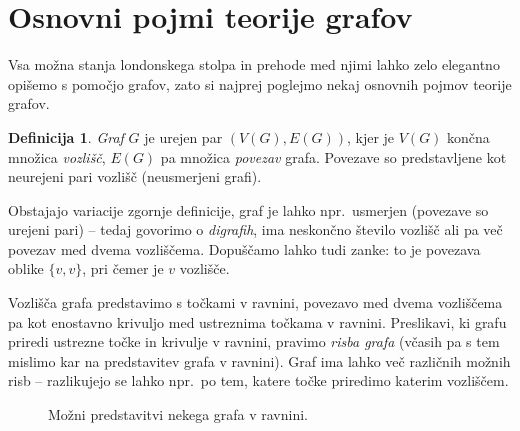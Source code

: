 \documentclass[12pt,a4paper]{amsart}
\theoremstyle{definition} %
\newtheorem{definicija}{Definicija}[section]
\theoremstyle{plain} %
\newcommand{\vozlisca}[1][G]{\ensuremath{V(#1)}}
\newcommand{\povezave}[1][G]{\ensuremath{E(#1)}}
\begin{document}
\section{Osnovni pojmi teorije grafov}

Vsa možna stanja londonskega stolpa in prehode med njimi lahko zelo elegantno opišemo s pomočjo grafov, zato si najprej poglejmo nekaj osnovnih pojmov teorije grafov.

\begin{definicija}
	\emph{Graf} $G$ je urejen par $(\vozlisca, \povezave)$, kjer je $\vozlisca$ končna množica \emph{vozlišč}, $\povezave$ pa množica \emph{povezav} grafa. Povezave so predstavljene kot neurejeni pari vozlišč (neusmerjeni grafi).
\end{definicija}

Obstajajo variacije zgornje definicije, graf je lahko npr.\ usmerjen (povezave so urejeni pari) -- tedaj govorimo o \emph{digrafih}, ima neskončno število vozlišč ali pa več povezav med dvema vozliščema. Dopuščamo lahko tudi zanke: to je povezava oblike $\{v,v\}$, pri čemer je $v$ vozlišče.

Vozlišča grafa predstavimo s točkami v ravnini, povezavo med dvema vozliščema pa kot enostavno krivuljo med ustreznima točkama v ravnini. Preslikavi, ki grafu priredi ustrezne točke in krivulje v ravnini, pravimo \emph{risba grafa} (včasih pa s tem mislimo kar na predstavitev grafa v ravnini). Graf ima lahko več različnih možnih risb -- razlikujejo se lahko npr.\ po tem, katere točke priredimo katerim vozliščem.

\begin{figure}[h]
    
    \caption{Možni predstavitvi nekega grafa v ravnini.}
\end{figure}
    
\end{document}
